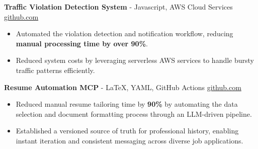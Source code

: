 \documentclass[11pt]{article}       %
\begin{document}

\textbf{Traffic Violation Detection System}{ - Javascript, AWS Cloud Services} \hfill \href{https://github.com/Monica20030707/AWS_rekonigition-N-read-database}{github.com} \\
\vspace{-9pt}
\begin{itemize}
  \item Automated the violation detection and notification workflow, reducing \textbf{manual processing time by over 90\%}.
  \item Reduced system costs by leveraging serverless AWS services to handle bursty traffic patterns efficiently.
\end{itemize}

\textbf{Resume Automation MCP}{ - LaTeX, YAML, GitHub Actions} \hfill \href{https://github.com/Monica20030707/Tex_OrangeLeaf-mcp}{github.com} \\
\vspace{-9pt}
\begin{itemize}
  \item Reduced manual resume tailoring time by \textbf{90\%} by automating the data selection and document formatting process through an LLM-driven pipeline.
  \item Established a versioned source of truth for professional history, enabling instant iteration and consistent messaging across diverse job applications.
\end{itemize}

\end{document}
